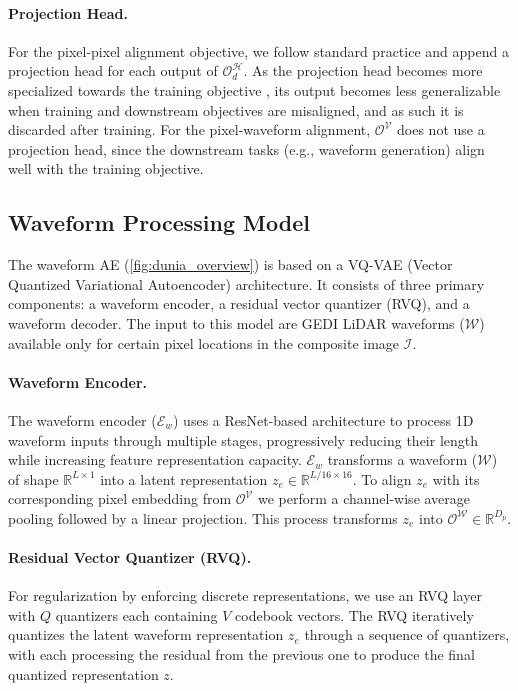 \paragraph{Projection Head.} For the pixel-pixel alignment objective, we follow standard practice and append a projection head for each output of $\mathcal{O}^\mathcal{H}_d$. As the projection head becomes more specialized towards the training objective \cite{xue2024projectionhead}, its output becomes less generalizable when training and downstream objectives are misaligned, and as such it is discarded after training. For the pixel-waveform alignment, $\mathcal{O}^\mathcal{V}$ does not use a projection head, since the downstream tasks (e.g., waveform generation) align well with the training objective.

\subsection{Waveform Processing Model}
\label{sec:waveform_ae}
The waveform AE (\cref{fig:dunia_overview}) is based on a VQ-VAE (Vector Quantized Variational Autoencoder) \citep{oordVQVAE} architecture. It consists of three primary components: a waveform encoder, a residual vector quantizer (RVQ), and a waveform decoder. The input to this model are GEDI LiDAR waveforms ($\mathcal{W}$) available only for certain pixel locations in the composite image $\mathcal{I}$.
\vspace{-0.3cm}
\paragraph{Waveform Encoder.} The waveform encoder ($\mathcal{E}_w$) uses a ResNet-based architecture to process 1D waveform inputs through multiple stages, progressively reducing their length while increasing feature representation capacity. $\mathcal{E}_w$ transforms a waveform ($\mathcal{W}$) of shape $\mathbb{R}^{L \times 1}$ into a latent representation $z_e \in \mathbb{R}^{L/16 \times 16}$. To align $z_e$ with its corresponding pixel embedding from $\mathcal{O}^\mathcal{V}$ we perform a channel-wise average pooling followed by a linear projection. This process transforms $z_e$ into $\mathcal{O}^\mathcal{W} \in \mathbb{R}^{D_p}$.
\vskip-0.1cm
\paragraph{Residual Vector Quantizer (RVQ).}\label{paragraph:rvq_layer} For regularization by enforcing discrete representations, we use an RVQ layer with $Q$ quantizers each containing $V$ codebook vectors. The RVQ iteratively quantizes the latent waveform representation $z_e$ through a sequence of quantizers, with each processing the residual from the previous one to produce the final quantized representation $z$.
\vskip-0.1cm
